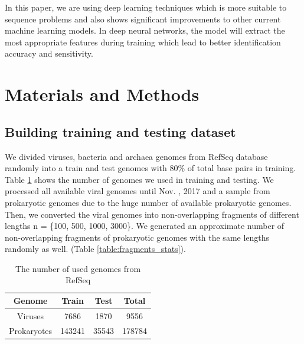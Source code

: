 \documentclass[conference]{IEEEtran}
\begin{document}

In this paper, we are using deep learning techniques which is more suitable to sequence problems and also shows significant improvements to other current machine learning models. In deep neural networks, the model will extract the most appropriate features during training which lead to better identification accuracy and sensitivity. 

\section{Materials and Methods}

\subsection{Building training and testing dataset}
We divided viruses, bacteria and archaea genomes from RefSeq database randomly into a train and test genomes with 80\% of total base pairs in training. Table \ref{table:genome_stats} shows the number of genomes we used in training and testing. We processed all available viral genomes until Nov. , 2017 and a sample from prokaryotic genomes due to the huge number of available prokaryotic genomes. Then, we converted the viral genomes into non-overlapping fragments of different lengths n = \{100, 500, 1000, 3000\}. We generated an approximate number of non-overlapping fragments of prokaryotic genomes with the same lengths randomly as well. (Table \ref{table:fragments_stats}). %


\begin{table}[!htbp]
	\centering
	\begin{tabular}{||c c c c||} 
		Genome & Train & Test & Total \\ [0.5ex] 
		\hline\hline
		Viruses & 7686  & 1870 & 9556 \\ 
		Prokaryotes & 143241  & 35543 & 178784  \\ [1ex] 
	\end{tabular}
	\caption{The number of used genomes from RefSeq}
	\label{table:genome_stats}
\end{table}
\end{document}
